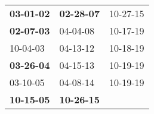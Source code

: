 \begin{supertabular}{p{0.33\columnwidth}p{0.33\columnwidth}p{0.33\columnwidth}}
 \textbf{03-01-02\textsuperscript{}} &  \textbf{02-28-07\textsuperscript{}} &  10-27-15\textsuperscript{} \\
 \textbf{02-07-03\textsuperscript{}} &           04-04-08\textsuperscript{} &  10-17-19\textsuperscript{} \\
          10-04-03\textsuperscript{} &           04-13-12\textsuperscript{} &  10-18-19\textsuperscript{} \\
 \textbf{03-26-04\textsuperscript{}} &           04-15-13\textsuperscript{} &  10-19-19\textsuperscript{} \\
          03-10-05\textsuperscript{} &           04-08-14\textsuperscript{} &  10-19-19\textsuperscript{} \\
 \textbf{10-15-05\textsuperscript{}} &  \textbf{10-26-15\textsuperscript{}} &                             \\
\end{supertabular}
